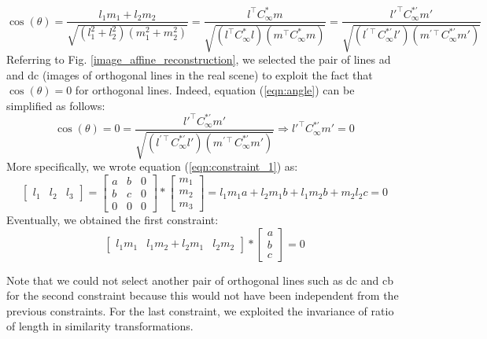 \documentclass[11pt, oneside]{article}
\begin{document}
\begin{equation}
	\label{eqn:angle}
	\cos(\theta) = \frac{l_1 m_1 + l_2  m_2}{\sqrt{(l_1^2 + l_2^2)(m_1^2 + m_2 ^2)}}
	=
	\frac{l^\intercal C^{*}_\infty m}{\sqrt{(l^\intercal C^{*}_\infty l)(m^\intercal C^{*}_\infty m)}} 
	= 
	\frac{l{'^\intercal} C^{*'}_\infty m'}{\sqrt{(l^{'\intercal} C^{*'}_\infty l')(m^{'\intercal} C^{*'}_\infty m')}}
\end{equation}
Referring to Fig. \ref{image_affine_reconstruction}, we selected the pair of lines ad and dc (images of orthogonal lines in the real scene) to exploit the fact that $\cos(\theta) = 0$ for orthogonal lines. Indeed, equation (\ref{eqn:angle}) can be simplified as follows:
\begin{equation}
	\label{eqn:constraint_1}
	\cos(\theta) = 0 =
	\frac{l{'^\intercal} C^{*'}_\infty m'}{\sqrt{(l^{'\intercal} C^{*'}_\infty l')(m^{'\intercal} C^{*'}_\infty m')}} 
	\Rightarrow
	l{'^\intercal} C^{*'}_\infty m' = 0
\end{equation}
More specifically, we wrote equation (\ref{eqn:constraint_1}) as:
\begin{equation}
	\begin{bmatrix}
		l_1 & l_2 & l_3
	\end{bmatrix}
	=
	\begin{bmatrix}
		a & b & 0 \\ b & c & 0 \\ 0 & 0 & 0
	\end{bmatrix} *
	\begin{bmatrix}
		m_1 \\ m_2 \\ m_3
	\end{bmatrix}
	= l_1 m_1 a + l_2 m_1 b + l_1 m_2 b + m_2 l_2 c = 0
\end{equation}
Eventually, we obtained the first constraint:
\begin{equation}
	\begin{bmatrix}
		l_1 m_1 & l_1 m_2 + l_2 m_1 & l_2 m_2
	\end{bmatrix}
	*
	\begin{bmatrix}
		a \\ b \\ c
	\end{bmatrix}
	= 0
\end{equation}

Note that we could not select another pair of orthogonal lines such as dc and cb for the second constraint because this would not have been independent from the previous constraints. For the last constraint, we exploited the invariance of ratio of length in similarity transformations.
\end{document}
